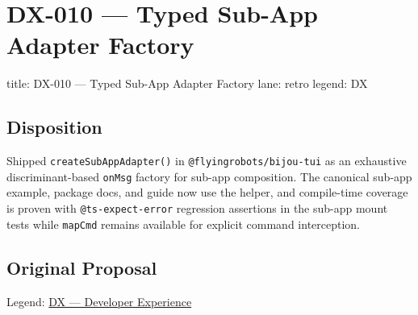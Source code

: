 \chapter{DX-010 --- Typed Sub-App Adapter Factory}\label{record-342}

\smallskip

\begin{RecordMeta}
title: DX-010 — Typed Sub-App Adapter Factory
lane: retro
legend: DX

\end{RecordMeta}

\section{Disposition}\label{record-342-disposition}

Shipped \texttt{c\allowbreak{}r\allowbreak{}e\allowbreak{}a\allowbreak{}t\allowbreak{}e\allowbreak{}S\allowbreak{}u\allowbreak{}b\allowbreak{}A\allowbreak{}p\allowbreak{}p\allowbreak{}A\allowbreak{}d\allowbreak{}a\allowbreak{}p\allowbreak{}t\allowbreak{}e\allowbreak{}r\allowbreak{}(\allowbreak{})} in \texttt{@\allowbreak{}f\allowbreak{}l\allowbreak{}y\allowbreak{}i\allowbreak{}n\allowbreak{}g\allowbreak{}r\allowbreak{}o\allowbreak{}b\allowbreak{}o\allowbreak{}t\allowbreak{}s\allowbreak{}/\allowbreak{}b\allowbreak{}i\allowbreak{}j\allowbreak{}o\allowbreak{}u\allowbreak{}-\allowbreak{}t\allowbreak{}u\allowbreak{}i} as an exhaustive discriminant-based \texttt{o\allowbreak{}n\allowbreak{}M\allowbreak{}s\allowbreak{}g} factory for sub-app composition. The canonical sub-app example, package docs, and guide now use the helper, and compile-time coverage is proven with \texttt{@\allowbreak{}t\allowbreak{}s\allowbreak{}-\allowbreak{}e\allowbreak{}x\allowbreak{}p\allowbreak{}e\allowbreak{}c\allowbreak{}t\allowbreak{}-\allowbreak{}e\allowbreak{}r\allowbreak{}r\allowbreak{}o\allowbreak{}r} regression assertions in the sub-app mount tests while \texttt{m\allowbreak{}a\allowbreak{}p\allowbreak{}C\allowbreak{}m\allowbreak{}d} remains available for explicit command interception.

\section{Original Proposal}\label{record-342-original-proposal}

Legend: \href{https://github.com/flyingrobots/bijou/blob/1853ad902f6bf219326409e7f743a5a1d6517dbc/docs/method/legends/DX-developer-experience.md}{DX --- Developer Experience}

